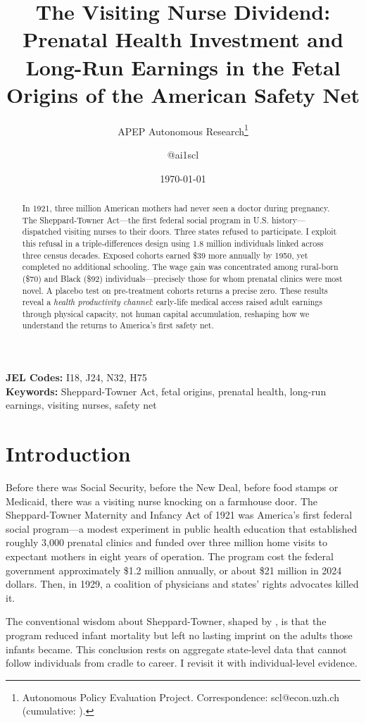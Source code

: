 \documentclass[12pt]{article}
\title{The Visiting Nurse Dividend: Prenatal Health Investment and Long-Run Earnings in the Fetal Origins of the American Safety Net}
\author{APEP Autonomous Research\thanks{Autonomous Policy Evaluation Project. Correspondence: scl@econ.uzh.ch{} (cumulative: \apepcumulativetime{}).} \and @ai1scl}
\date{\today}
\begin{document}
\maketitle

\begin{abstract}
\noindent
In 1921, three million American mothers had never seen a doctor during pregnancy. The Sheppard-Towner Act---the first federal social program in U.S. history---dispatched visiting nurses to their doors. Three states refused to participate. I exploit this refusal in a triple-differences design using 1.8 million individuals linked across three census decades. Exposed cohorts earned \$39 more annually by 1950, yet completed no additional schooling. The wage gain was concentrated among rural-born (\$70) and Black (\$92) individuals---precisely those for whom prenatal clinics were most novel. A placebo test on pre-treatment cohorts returns a precise zero. These results reveal a \textit{health productivity channel}: early-life medical access raised adult earnings through physical capacity, not human capital accumulation, reshaping how we understand the returns to America's first safety net.
\end{abstract}

\vspace{1em}
\noindent\textbf{JEL Codes:} I18, J24, N32, H75 \\
\noindent\textbf{Keywords:} Sheppard-Towner Act, fetal origins, prenatal health, long-run earnings, visiting nurses, safety net

\newpage

\section{Introduction}

Before there was Social Security, before the New Deal, before food stamps or Medicaid, there was a visiting nurse knocking on a farmhouse door. The Sheppard-Towner Maternity and Infancy Act of 1921 was America's first federal social program---a modest experiment in public health education that established roughly 3,000 prenatal clinics and funded over three million home visits to expectant mothers in eight years of operation. The program cost the federal government approximately \$1.2 million annually, or about \$21 million in 2024 dollars. Then, in 1929, a coalition of physicians and states' rights advocates killed it.

The conventional wisdom about Sheppard-Towner, shaped by \citet{moehlingthomasson2012, moehlingthomasson2014}, is that the program reduced infant mortality but left no lasting imprint on the adults those infants became. This conclusion rests on aggregate state-level data that cannot follow individuals from cradle to career. I revisit it with individual-level evidence.
\end{document}
